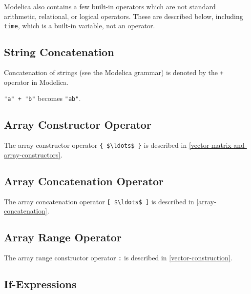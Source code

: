 Modelica also contains a few built-in operators which are not standard arithmetic, relational, or logical operators.
These are described below, including \lstinline!time!, which is a built-in variable, not an operator.

\subsection{String Concatenation}\label{string-concatenation}

Concatenation of strings (see the Modelica grammar) is denoted by the \lstinline!+! operator in Modelica.

\begin{example}
\lstinline!"a" + "b"! becomes \lstinline!"ab"!.
\end{example}

\subsection{Array Constructor Operator}\label{array-constructor-operator}

The array constructor operator \lstinline!{ $\ldots$ }! is described in \cref{vector-matrix-and-array-constructors}.

\subsection{Array Concatenation Operator}\label{array-concatenation-operator}

The array concatenation operator \lstinline![ $\ldots$ ]! is described in \cref{array-concatenation}.

\subsection{Array Range Operator}\label{array-range-operator}

The array range constructor operator \lstinline!:! is described in \cref{vector-construction}.

\subsection{If-Expressions}\label{if-expressions}

